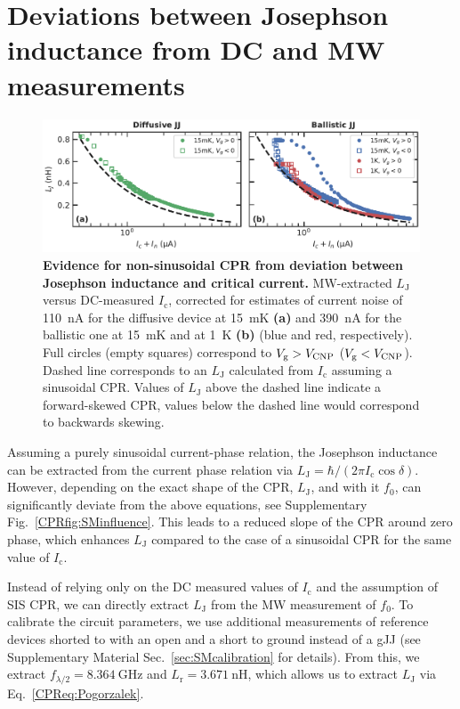 \section{Deviations between Josephson inductance from DC and MW measurements}

\begin{figure}[t]
	\centering
	\includegraphics[width=\linewidth]{chapter-gJJ-CPR/figs/SMFigure2}
	\caption{
		\textbf{Evidence for non-sinusoidal CPR from deviation between Josephson inductance and critical current.}
		MW-extracted $L_\text{J}$ versus DC-measured $I_\text{c}$, corrected for estimates of current noise of \SI{110}{\nano\ampere} for the diffusive device at \SI{15}{\milli\kelvin} \textbf{(a)} and \SI{390}{\nano\ampere} for the ballistic one at \SI{15}{\milli\kelvin} and at \SI{1}{\kelvin} \textbf{(b)} (blue and red, respectively).
		Full circles (empty squares) correspond to $V_\text{g}>V_{\rm CNP}$ ($V_\text{g}<V_{\rm CNP}$).
		Dashed line corresponds to an $L_\text{J}$ calculated from $I_\text{c}$ assuming a sinusoidal CPR.
		Values of $L_\text{J}$ above the dashed line indicate a forward-skewed CPR, values below the dashed line would correspond to backwards skewing.
	}
	\label{CPRfig:figure2}
\end{figure}

Assuming a purely sinusoidal current-phase relation, the Josephson inductance can be extracted from the current phase relation via $L_\text{J} = \hbar/(2\pi I_\text{c} \cos\delta)$.
%
However, depending on the exact shape of the CPR, $L_\text{J}$, and with it $f_0$, can significantly deviate from the above equations, see Supplementary Fig.~\ref{CPRfig:SMinfluence}.
%
This leads to a reduced slope of the CPR around zero phase, which enhances $L_\text{J}$ compared to the case of a sinusoidal CPR for the same value of $I_\text{c}$.

Instead of relying only on the DC measured values of $I_\text{c}$ and the assumption of SIS CPR, we can directly extract $L_\text{J}$ from the MW measurement of $f_0$.
%
To calibrate the circuit parameters, we use additional measurements of reference devices shorted to with an open and a short to ground instead of a gJJ (see Supplementary Material Sec.~\ref{sec:SMcalibration} for details).
%
From this, we extract $f_{\lambda/2}=\SI{8.364}{\giga\hertz}$ and $L_\text{r}=\SI{3.671}{\nano\henry}$, which allows us to extract $L_\text{J}$ via Eq.~\ref{CPReq:Pogorzalek}.

